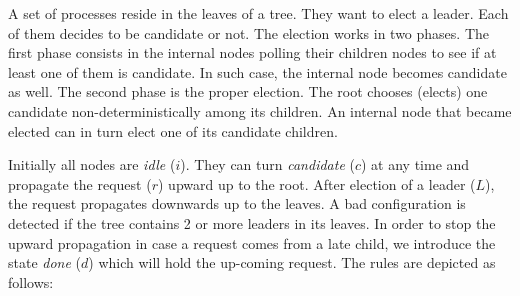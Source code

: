 A set of processes reside in the leaves of a tree. They want to elect
a leader. Each of them decides to be candidate or not. The election
works in two phases. The first phase consists in the internal nodes
polling their children nodes to see if at least one of them is
candidate. In such case, the internal node becomes candidate as
well. The second phase is the proper election. The root chooses
(elects) one candidate non-deterministically among its children. An
internal node that became elected can in turn elect one of its
candidate children.

Initially all nodes are \emph{idle} ($i$). They can turn
\emph{candidate} ($c$) at any time and propagate the request ($r$)
upward up to the root. After election of a leader ($L$), the request
propagates downwards up to the leaves. A bad configuration is detected
if the tree contains 2 or more leaders in its leaves. In order to stop
the upward propagation in case a request comes from a late child, we
introduce the state \emph{done} ($d$) which will hold the up-coming
request. The rules are depicted as follows:

